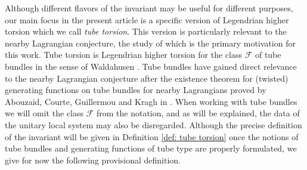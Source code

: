 \documentclass{amsart}
\newcommand\cF{\mathcal{F}}
\newcommand\cH{\mathcal{H}}
\def\bQ{\mathbf{Q}}
\def\bR{\mathbf{R}}
\def\bZ{\mathbf{Z}}
\theoremstyle{definition}
\theoremstyle{remark}
\newtheorem{inductive lemma}[theorem]{Inductive Lemma}
\begin{document}
Although different flavors of the invariant may be useful for different purposes, our main focus in the present article is a specific version of Legendrian higher torsion which we call {\em tube  torsion}. This version is particularly relevant to the nearby Lagrangian conjecture, the study of which is the primary motivation for this work.  Tube torsion is Legendrian higher torsion for the class $\cF$ of tube bundles in the sense of Waldahusen \cite{W82}. Tube bundles have gained direct relevance to the nearby Lagrangian conjecture after the existence theorem for (twisted) generating functions on tube bundles for nearby Lagrangians proved by Abouzaid, Courte, Guillermou and Kragh in \cite{ACGK}. When working with tube bundles we will omit the class $\cF$ from the notation, and as will be explained, the data of the unitary local system may also be disregarded. Although the precise definition of the invariant will be given in Definition \ref{def: tube torsion} once the notions of tube bundles and generating functions of tube type are properly formulated, we give for now the following provisional definition. 
 
\end{document}
